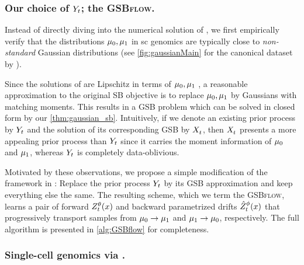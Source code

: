 \subsubsection*{Our choice of $Y_{ t }$; the \textsc{GSBflow}.}

Instead of directly diving into the numerical solution of , we first empirically verify that the distributions $\mu_0,\mu_1$ in \acrlong{sc} genomics are typically close to \emph{non-standard} Gaussian distributions (see \cref{fig:gaussianMain} for the canonical dataset by \citet{schiebinger2019optimal}). 

Since the solutions of  are Lipschitz in terms of $\mu_0,\mu_1$ \citep{carlier2022lipschitz}, a reasonable approximation to the original \acrshort{SB} objective is to replace $\mu_0,\mu_1$ by Gaussians with matching moments. This results in a \acrshort{GSB} problem which can be solved in closed form by our \cref{thm:gaussian_sb}. Intuitively, if we denote an existing prior process by $Y_{ t }$ and the solution of its corresponding \acrshort{GSB} by $X^{}_{ t }$, then $X^{}_{ t }$ presents a more appealing prior process than $Y_{ t }$ since it carries the moment information of $\mu_0$ and $\mu_1$, whereas $Y_{ t }$ is completely data-oblivious.

Motivated by these observations, we propose a simple modification of the framework in \citet{chen2021likelihood}: Replace the prior process $Y_{ t }$ by its \acrshort{GSB} approximation and keep everything else the same. The resulting scheme, which we term the \textsc{GSBflow}, learns a pair of forward {\color{pink} $\SBf$} and backward parametrized drifts {\color{blue} $\SBb$} that progressively transport samples from $\mu_0 \rightarrow \mu_1$ and $\mu_1 \rightarrow \mu_0$, respectively. The full algorithm is presented in \cref{alg:GSBflow} for completeness.

\subsubsection*{Single-cell genomics via .}

